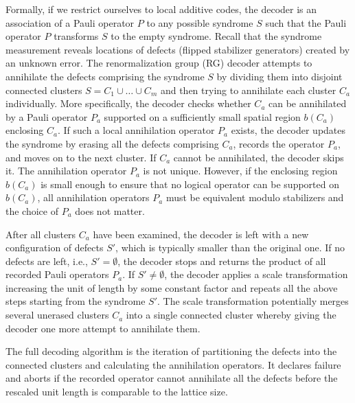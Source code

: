 Formally, if we restrict ourselves to local additive codes,
the decoder is an association of a Pauli operator $P$ to any possible syndrome $S$
such that the Pauli operator $P$ transforms $S$ to the empty syndrome.
Recall that the syndrome measurement reveals locations of defects (flipped stabilizer generators)
created by an unknown error. The renormalization group (RG) decoder attempts to annihilate the defects comprising
the syndrome $S$ by dividing them into disjoint connected clusters $S=C_1\cup \ldots \cup C_m$ 
and then trying to annihilate each cluster $C_a$  individually.
More specifically, the decoder checks whether $C_a$ can be annihilated by a Pauli operator  $P_a$
supported  on a sufficiently small spatial region  $b(C_a)$ enclosing $C_a$.
If such a local annihilation operator $P_a$ exists, the decoder  updates the syndrome by erasing
all the defects comprising $C_a$, records the operator $P_a$, and moves on to the next cluster.
If $C_a$ cannot be annihilated, the decoder skips it.
The annihilation operator $P_a$ is not unique.
However, if the enclosing region $b(C_a)$ is small enough to ensure that no logical operator
can be supported on $b(C_a)$, all annihilation operators $P_a$ must be equivalent modulo stabilizers
and the choice of $P_a$ does not matter.

After all clusters $C_a$ have been examined, the decoder is left with a new configuration of defects
$S'$, which is typically smaller than the original one.
If no defects are left, i.e., $S'=\emptyset$, the decoder stops and returns the product of all recorded Pauli operators $P_a$.
If $S'\ne \emptyset$,  the decoder applies a scale transformation
increasing the unit of length by some constant factor and repeats all the above steps starting from the syndrome $S'$.
The scale transformation potentially merges several unerased clusters $C_a$ into a single connected cluster
whereby giving the decoder one more attempt to annihilate them.

The full decoding algorithm is the iteration of partitioning the defects into the connected clusters and calculating the annihilation operators. It declares failure and aborts if the recorded operator cannot annihilate all the defects before the rescaled unit length is comparable to the lattice size.

